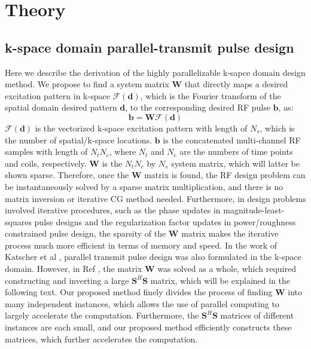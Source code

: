 \section*{Theory}

\subsection*{k-space domain parallel-transmit pulse design}
\par Here we describe the derivation of the highly parallelizable k-sapce domain design method. We propose to find a system matrix $\mathbf{W}$ that directly maps a desired excitation pattern in k-space $\mathcal{F}(\mathbf{d})$, which is the Fourier transform of the spatial domain desired pattern $\mathbf{d}$, to the corresponding desired RF pulse $\mathbf{b}$, as:
\begin{equation*}
\mathbf{b}=\mathbf{W}\mathcal{F}(\mathbf{d})
\end{equation*}
$\mathcal{F}(\mathbf{d})$ is the vectorized k-space excitation pattern with length of $N_s$, which is the number of spatial/k-space locations.  $\mathbf{b}$ is the concatenated multi-channel RF samples with length of $N_tN_c$, where $N_t$ and $N_c$ are the numbers of time points and coils, respectively. $\mathbf{W}$ is the $N_tN_c$ by $N_s$ system matrix, which will latter be shown sparse.
Therefore, once the $\mathbf{W}$ matrix is found, the RF design problem can be instantaneously solved by a sparse matrix multiplication, and there is no matrix inversion or iterative CG method needed. Furthermore, in design problems involved iterative procedures, such as the phase updates in magnitude-least-squares pulse designs \cite{setsompop2008magnitude} and the regularization factor updates in power/roughness constrained pulse design, the sparsity of the $\mathbf{W}$ matrix makes the iterative process much more efficient in terms of memory and speed. In the work of Katscher et al \cite{katscher2003transmit}, parallel transmit pulse design was also formulated in the k-space domain. However, in Ref \cite{katscher2003transmit}, the matrix $\mathbf{W}$ was solved as a whole, which required constructing and inverting a large $\mathbf{S}^H\mathbf{S}$ matrix, which will be explained in the following text. Our proposed method finely divides the process of finding $\mathbf{W}$ into many independent instances, which allows the use of parallel computing to largely accelerate the computation. Furthermore, the $\mathbf{S}^H\mathbf{S}$ matrices of different instances are each small, and our proposed method efficiently constructs these matrices, which further accelerates the computation. 

